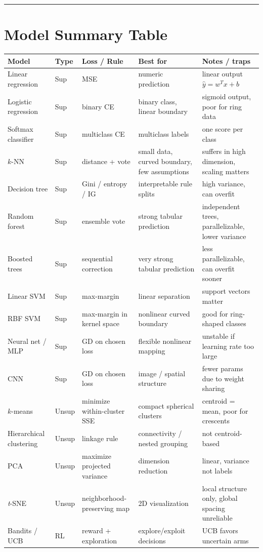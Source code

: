 \documentclass[11pt,landscape]{article}
\begin{document}
	\vspace{0.15em}
	\hrule
	\vspace{0.15em}
	
	
	\section{Model Summary Table}
	\begin{tabularx}{\linewidth}{@{}L{1.05in}L{0.7in}L{1.15in}L{1.5in}L{2.45in}@{}}
		\toprule
		\textbf{Model} & \textbf{Type} & \textbf{Loss / Rule} & \textbf{Best for} & \textbf{Notes / traps} \\
		\midrule
		Linear regression & Sup & MSE & numeric prediction & linear output $\hat y=w^Tx+b$ \\
		Logistic regression & Sup & binary CE & binary class, linear boundary & sigmoid output, poor for ring data \\
		Softmax classifier & Sup & multiclass CE & multiclass labels & one score per class \\
		$k$-NN & Sup & distance + vote & small data, curved boundary, few assumptions & suffers in high dimension, scaling matters \\
		Decision tree & Sup & Gini / entropy / IG & interpretable rule splits & high variance, can overfit \\
		Random forest & Sup & ensemble vote & strong tabular prediction & independent trees, parallelizable, lower variance \\
		Boosted trees & Sup & sequential correction & very strong tabular prediction & less parallelizable, can overfit sooner \\
		Linear SVM & Sup & max-margin & linear separation & support vectors matter \\
		RBF SVM & Sup & max-margin in kernel space & nonlinear curved boundary & good for ring-shaped classes \\
		Neural net / MLP & Sup & GD on chosen loss & flexible nonlinear mapping & unstable if learning rate too large \\
		CNN & Sup & GD on chosen loss & image / spatial structure & fewer params due to weight sharing \\
		$k$-means & Unsup & minimize within-cluster SSE & compact spherical clusters & centroid = mean, poor for crescents \\
		Hierarchical clustering & Unsup & linkage rule & connectivity / nested grouping & not centroid-based \\
		PCA & Unsup & maximize projected variance & dimension reduction & linear, variance not labels \\
		\textit{t}-SNE & Unsup & neighborhood-preserving map & 2D visualization & local structure only, global spacing unreliable \\
		Bandits / UCB & RL & reward + exploration & explore/exploit decisions & UCB favors uncertain arms \\
		\bottomrule
	\end{tabularx}
	
\end{document}
